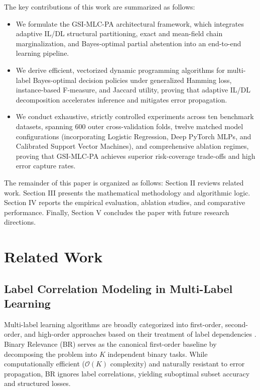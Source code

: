 \documentclass[conference]{IEEEtran}
\begin{document}
The key contributions of this work are summarized as follows:
\begin{itemize}
    \item We formulate the GSI-MLC-PA architectural framework, which integrates adaptive IL/DL structural partitioning, exact and mean-field chain marginalization, and Bayes-optimal partial abstention into an end-to-end learning pipeline.
    \item We derive efficient, vectorized dynamic programming algorithms for multi-label Bayes-optimal decision policies under generalized Hamming loss, instance-based F-measure, and Jaccard utility, proving that adaptive IL/DL decomposition accelerates inference and mitigates error propagation.
    \item We conduct exhaustive, strictly controlled experiments across ten benchmark datasets, spanning 600 outer cross-validation folds, twelve matched model configurations (incorporating Logistic Regression, Deep PyTorch MLPs, and Calibrated Support Vector Machines), and comprehensive ablation regimes, proving that GSI-MLC-PA achieves superior risk-coverage trade-offs and high error capture rates.
\end{itemize}

The remainder of this paper is organized as follows: Section II reviews related work. Section III presents the mathematical methodology and algorithmic logic. Section IV reports the empirical evaluation, ablation studies, and comparative performance. Finally, Section V concludes the paper with future research directions.

\section{Related Work}
\subsection{Label Correlation Modeling in Multi-Label Learning}
Multi-label learning algorithms are broadly categorized into first-order, second-order, and high-order approaches based on their treatment of label dependencies \cite{zhang2018binary}. Binary Relevance (BR) serves as the canonical first-order baseline by decomposing the problem into $K$ independent binary tasks. While computationally efficient ($\mathcal{O}(K)$ complexity) and naturally resistant to error propagation, BR ignores label correlations, yielding suboptimal subset accuracy and structured losses.
\end{document}
